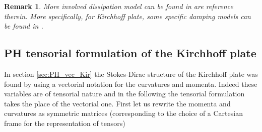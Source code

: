 \documentclass[preprint,12pt]{elsarticle}
\newtheorem{remark}{Remark}
\begin{document}
\begin{remark}
More involved dissipation model can be found in \cite{DissDenis} are reference therein. More specifically, for Kirchhoff plate, some specific damping models can be found in \cite{LambourgJASA}.
\end{remark}	

	
	\subsection{PH tensorial formulation of the Kirchhoff plate}
	\label{sec:PH_ten_Kir}
	
	In section \ref{sec:PH_vec_Kir} the Stokes-Dirac structure of the Kirchhoff plate was found by using a vectorial notation for the curvatures and momenta. Indeed these variables are of tensorial nature and in the following the tensorial formulation takes the place of the vectorial one. First let us rewrite the momenta and curvatures as symmetric matrices (corresponding to the choice of a Cartesian frame for the representation of tensors)
	
\end{document}

